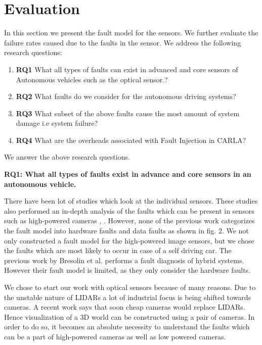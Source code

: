 \section{Evaluation}
In this section we present the fault model for the sensors. We further evaluate the failure rates caused due to the faults in the sensor. We address the following research questions:
\begin{enumerate}
	\item \textbf{RQ1}
	What all types of faults can exist in advanced and core sensors of Autonomous vehicles such as the optical sensor.?
	\item \textbf{RQ2}
	What faults do we consider for the autonomous driving systems?
	\item \textbf{RQ3}
	What subset of the above faults cause the most amount of system damage i.e system failure?
	\item \textbf{RQ4}
	What are the overheads associated with Fault Injection in CARLA?
	
\end{enumerate}
We answer the above research questions. 

\vskip 0.1in
\textbf{RQ1: What all types of faults exist in advance and core sensors in an autonomous vehicle.}

There have been lot of studies which look at the individual sensors. These studies also performed an in-depth analysis of the faults which can be present in sensors such as high-powered cameras \cite{5530865}, \cite{inproceedings}. However, none of the previous work categorizes the fault model into hardware faults and data faults as shown in fig. 2. We not only constructed a fault model for the high-powered image sensors, but we chose the faults which are most likely to occur in case of a self driving car. The previous work by Bresolin et al. \cite{inproceedings} performs a fault diagnosis of hybrid systems. However their fault model is limited, as they only consider the hardware faults. 

We chose to start our work with optical sensors because of many reasons. Due to the unstable nature of LIDARs a lot of industrial focus is being shifted towards cameras. A recent work says that soon cheap cameras would replace LIDARs\cite{cheapcamera}. Hence visualization of a 3D world can be constructed using a pair of cameras. In order to do so, it becomes an absolute necessity to understand the faults which can be a part of high-powered cameras as well as low powered cameras. 

